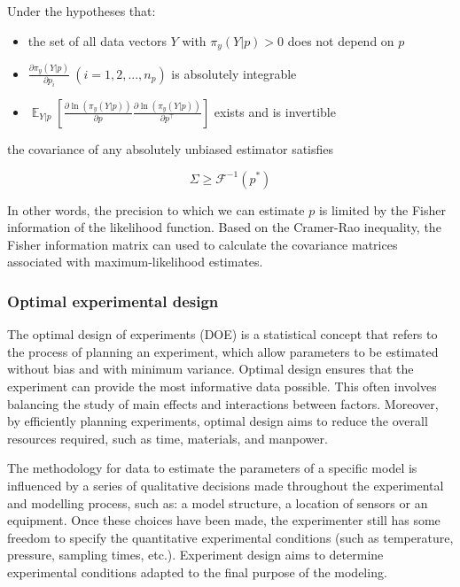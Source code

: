 \documentclass[../Article_Design_of_Experiment.tex]{subfiles}
\begin{document}
	Under the hypotheses that:
	
	\begin{itemize}
		\item the set of all data vectors $Y$ with $\pi_y(Y|p) > 0$ does not depend on $p$
		\item $\frac{\partial \pi_y(Y|p)}{\partial p_i}~\left(i=1,2,...,n_p\right)$ is absolutely integrable
		\item $\mathop{\mathbb{E}}_{Y|p} \left[ \frac{\partial \ln (\pi_y (Y|p))}{\partial p} \frac{\partial \ln (\pi_y (Y|p))}{\partial p^\top} \right]$ exists and is invertible
	\end{itemize}
	
	the covariance of any absolutely unbiased estimator satisfies
	
	{\footnotesize
	\begin{equation}
		\Sigma \geq \mathcal{F}^{-1}(p^*)
	\end{equation} }
	
	In other words, the precision to which we can estimate $p$ is limited by the Fisher information of the likelihood function. Based on the Cramer-Rao inequality, the Fisher information matrix can used to calculate the covariance matrices associated with maximum-likelihood estimates.
	
	\subsubsection{Optimal experimental design}
	
	The optimal design of experiments (DOE) is a statistical concept that refers to the process of planning an experiment, which allow parameters to be estimated without bias and with minimum variance. Optimal design ensures that the experiment can provide the most informative data possible. This often involves balancing the study of main effects and interactions between factors. Moreover, by efficiently planning experiments, optimal design aims to reduce the overall resources required, such as time, materials, and manpower.
	
	The methodology for data to estimate the parameters of a specific model is influenced by a series of qualitative decisions made throughout the experimental and modelling process, such as: a model structure, a location of sensors or an equipment. Once these choices have been made, the experimenter still has some freedom to specify the quantitative experimental conditions (such as temperature, pressure, sampling times, etc.). Experiment design aims to determine experimental conditions adapted to the final purpose of the modeling. 
	
\end{document}
